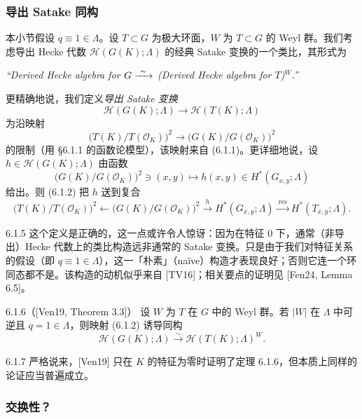 
\subsubsection{导出 Satake 同构}

本小节假设 $q\equiv1\in\Lambda$。设 $T\subset G$ 为极大环面，$W$ 为 $T\subset G$ 的 Weyl 群。我们考虑导出 Hecke 代数 $\mathcal H(G(K);\Lambda)$ 的经典 Satake 变换的一个类比，其形式为
\begin{center}
\itshape ``Derived Hecke algebra for $G\xrightarrow{\ \sim\ }$ (Derived Hecke algebra for $T$)$^W$.''
\end{center}

更精确地说，我们定义\emph{导出 Satake 变换}
\begin{equation}\tag{6.1.2}\label{eq:a6-04-6}
\mathcal H(G(K);\Lambda)\to\mathcal H(T(K);\Lambda)
\end{equation}
为沿映射
\[
\bigl(T(K)/T(\mathcal O_K)\bigr)^2\to\bigl(G(K)/G(\mathcal O_K)\bigr)^2
\]
的限制（用 §6.1.1 的函数论模型），该映射来自 (6.1.1)。更详细地说，设 $h\in\mathcal H(G(K);\Lambda)$ 由函数
\[
\bigl(G(K)/G(\mathcal O_K)\bigr)^2\ni(x,y)\mapsto h(x,y)\in H^*(G_{x,y};\Lambda)
\]
给出。则 (6.1.2) 把 $h$ 送到复合
\[
\bigl(T(K)/T(\mathcal O_K)\bigr)^2\longleftarrow\bigl(G(K)/G(\mathcal O_K)\bigr)^2
\xrightarrow{\ h\ }H^*(G_{x,y};\Lambda)\xrightarrow{\ \mathrm{res}\ }H^*(T_{x,y};\Lambda).
\]

\begin{rem}{6.1.5}\label{thm:a6-04-5}
这个定义是正确的，这一点或许令人惊讶：因为在特征 $0$ 下，通常（非导出）Hecke 代数上的类比构造远非通常的 Satake 变换。只是由于我们对特征关系的假设（即 $q\equiv1\in\Lambda$），这一「朴素」（naïve）构造才表现良好；否则它连一个环同态都不是。该构造的动机似乎来自 [TV16]；相关要点的证明见 [Fen24, Lemma 6.5]。
\end{rem}

\begin{thm}{6.1.6}（[Ven19, Theorem 3.3]）\label{thm:a6-04-6}
设 $W$ 为 $T$ 在 $G$ 中的 Weyl 群。若 $|W|$ 在 $\Lambda$ 中可逆且 $q=1\in\Lambda$，则映射 (6.1.2) 诱导同构
\[
\mathcal H(G(K);\Lambda)\xrightarrow{\sim}\mathcal H(T(K);\Lambda)^W.
\]
\end{thm}

\begin{rem}{6.1.7}\label{thm:a6-04-7}
严格说来，[Ven19] 只在 $K$ 的特征为零时证明了定理 6.1.6，但本质上同样的论证应当普遍成立。
\end{rem}

\subsubsection{交换性？}

